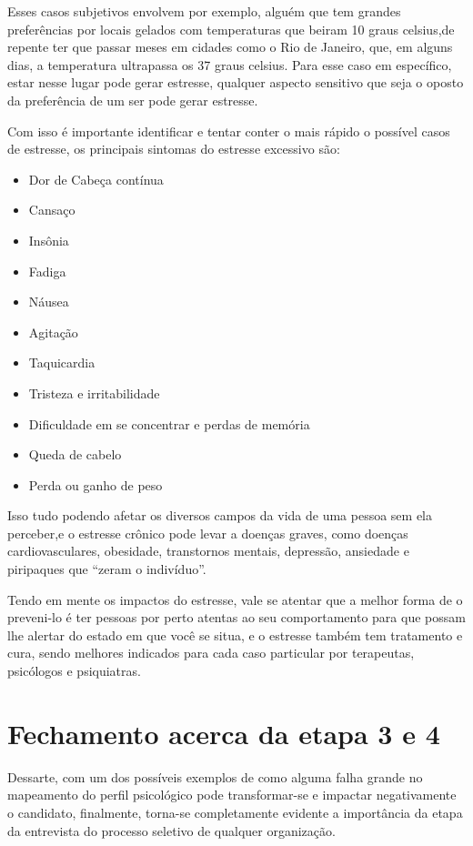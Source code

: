 \documentclass[12pt]{article}
\begin{document}
Esses casos subjetivos envolvem por exemplo, alguém que tem grandes preferências por locais gelados com temperaturas que beiram 10 graus celsius,de repente ter que passar meses em cidades como o Rio de Janeiro, que, em alguns dias, a temperatura ultrapassa os 37 graus celsius. Para esse caso em específico, estar nesse lugar pode gerar estresse, qualquer aspecto sensitivo que seja o oposto da preferência de um ser pode gerar estresse.

Com isso é importante identificar e tentar conter o mais rápido o possível casos de estresse, os principais sintomas do estresse excessivo são:
\begin{itemize}
	\item Dor de Cabeça contínua
	\item Cansaço
	\item Insônia
	\item Fadiga
	\item Náusea
	\item Agitação
	\item Taquicardia
	\item Tristeza e irritabilidade
	\item Dificuldade em se concentrar e perdas de memória
	\item Queda de cabelo
	\item Perda ou ganho de peso
\end{itemize}

Isso tudo podendo afetar os diversos campos da vida de uma pessoa sem ela perceber,e o estresse crônico pode levar a doenças graves, como doenças cardiovasculares, obesidade, transtornos mentais, depressão, ansiedade e piripaques que “zeram o indivíduo”.

Tendo em mente os impactos do estresse, vale se atentar que a melhor forma de o preveni-lo é ter pessoas por perto atentas ao seu comportamento para que possam lhe alertar do estado em que você se situa, e o estresse também tem tratamento e cura, sendo melhores indicados para cada caso particular por terapeutas, psicólogos e psiquiatras.

\section{Fechamento acerca da etapa 3 e 4}


Dessarte, com um dos possíveis exemplos de como alguma falha grande no mapeamento do perfil psicológico pode transformar-se e impactar negativamente o candidato, finalmente, torna-se completamente evidente a importância da etapa da entrevista do processo seletivo de qualquer organização.
\end{document}
